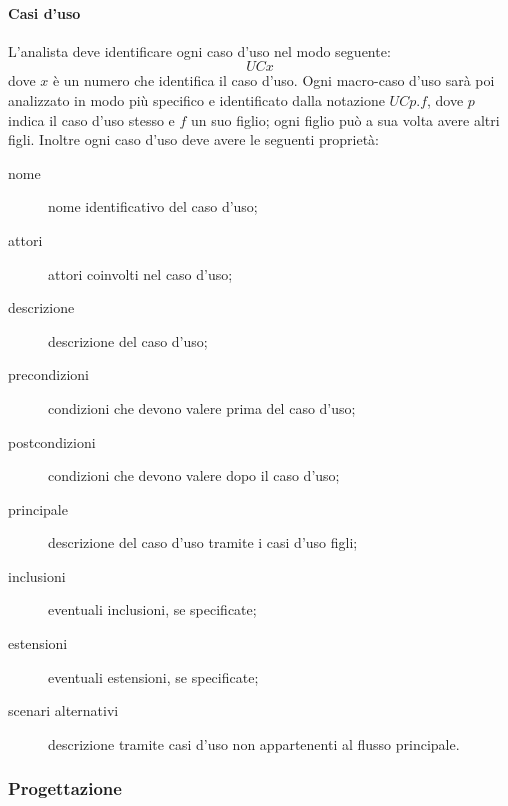 		\paragraph{Casi d'uso}
		L'analista deve identificare ogni caso d'uso nel modo seguente:
			\[UCx\]
		dove $x$ è un numero che identifica il caso d'uso. Ogni macro-caso d'uso sarà poi analizzato in modo più specifico e identificato dalla notazione $UCp.f$, dove $p$ indica il caso d'uso stesso e $f$ un suo figlio; ogni figlio può a sua volta avere altri figli. Inoltre ogni caso d'uso deve avere le seguenti proprietà:
		\begin{description}
			\item[nome] nome identificativo del caso d'uso;
			\item[attori] attori coinvolti nel caso d'uso;
			\item[descrizione] descrizione del caso d'uso;
			\item[precondizioni] condizioni che devono valere prima del caso d'uso;
			\item[postcondizioni] condizioni che devono valere dopo il caso d'uso;
			\item[ principale] descrizione del caso d'uso tramite i casi d'uso figli;
			\item[inclusioni] eventuali inclusioni, se specificate;
			\item[estensioni] eventuali estensioni, se specificate;
			\item[scenari alternativi] descrizione tramite casi d'uso non appartenenti al flusso principale.
		\end{description}

	\subsubsection{Progettazione} \label{sec:design}
